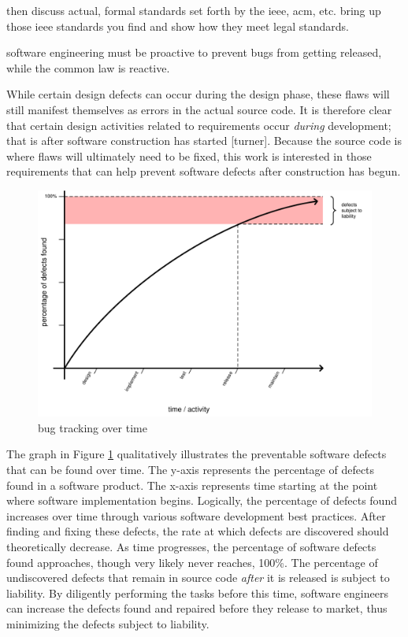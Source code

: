 \documentclass[12pt]{report}
\begin{document}
then discuss actual, formal standards set forth by the ieee, acm, etc. bring up those ieee standards you find and show how they meet legal standards.  

software engineering must be proactive to prevent bugs from getting released, while the common law is reactive. 

While certain design defects can occur during the design phase, these flaws will still manifest themselves as errors in the actual source code. It is therefore clear that certain design activities related to requirements occur \textit{during} development; that is after software construction has started [turner]. Because the source code is where flaws will ultimately need to be fixed, this work is interested in those requirements that can help prevent software defects after construction has begun. 

\begin{figure}[t] 
\begin{center} 
\includegraphics[scale=0.77]{figures/graph.pdf} 
\end{center} 
\caption{bug tracking over time} 
\label{fig:bugs} 
\end{figure} 

The graph in Figure \ref{fig:bugs} qualitatively illustrates the preventable software defects that can be found over time. The y-axis represents the percentage of defects found in a software product. The x-axis represents time starting at the point where software implementation begins. Logically, the percentage of defects found increases over time through various software development best practices. After finding and fixing these defects, the rate at which defects are discovered should theoretically decrease. As time progresses, the percentage of software defects found approaches, though very likely never reaches, 100\%. The percentage of undiscovered defects that remain in source code \textit{after} it is released is subject to liability. By diligently performing the tasks before this time, software engineers can increase the defects found and repaired before they release to market, thus minimizing the defects subject to liability. 
\end{document}
